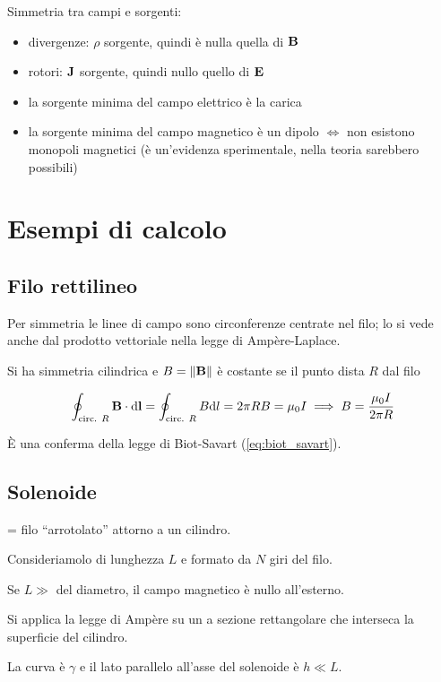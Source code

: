 Simmetria tra campi e sorgenti:
\begin{itemize}
    \item divergenze: $\rho$ sorgente, quindi è nulla quella di $\mathbf{B}$
    \item rotori: $\mathbf{J}$ sorgente, quindi nullo quello di $\mathbf{E}$
    \item la sorgente minima del campo elettrico è la carica
    \item la sorgente minima del campo magnetico è un dipolo $\iff$ non esistono monopoli magnetici (è un'evidenza sperimentale, nella teoria sarebbero possibili)
\end{itemize}

\section{Esempi di calcolo}

\subsection{Filo rettilineo}

Per simmetria le linee di campo sono circonferenze centrate nel filo; lo si vede anche dal prodotto vettoriale nella legge di Ampère-Laplace.

Si ha simmetria cilindrica e $B = \left\lVert \mathbf{B} \right\rVert$ è costante se il punto dista $R$ dal filo

\begin{equation}
    \oint_\text{circ. $R$} \mathbf{B} \cdot \mathrm{d} \mathbf{l}
    = \oint_\text{circ. $R$} B \mathrm{d} l
    = 2\pi R B
    = \mu_0 I \implies B
    = \frac{\mu_0 I}{2\pi R}
\end{equation}

È una conferma della legge di Biot-Savart (\cref{eq:biot_savart}).

\subsection{Solenoide}

= filo ``arrotolato'' attorno a un cilindro.

Consideriamolo di lunghezza $L$ e formato da $N$ giri del filo.

Se $L \gg$ del diametro, il campo magnetico è nullo all'esterno.

Si applica la legge di Ampère su un a sezione rettangolare che interseca la superficie del cilindro.

La curva è $\gamma$ e il lato parallelo all'asse del solenoide è $h \ll L$.

